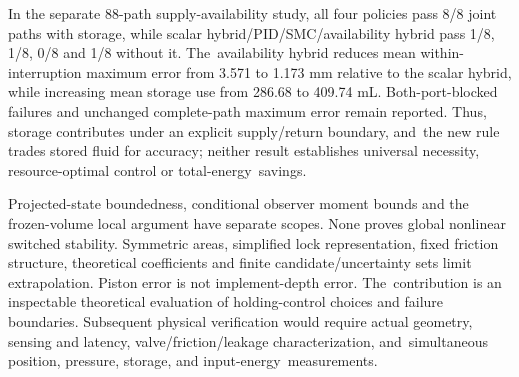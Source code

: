\documentclass[machines,article,submit,pdftex,moreauthors]{Definitions/mdpi}
\begin{document}
In the separate 88-path supply-availability study, all four policies pass 8/8 joint paths with storage, while scalar hybrid/PID/SMC/availability hybrid pass 1/8, 1/8, 0/8 and 1/8 without it. The~availability hybrid reduces mean within-interruption maximum error from 3.571 to 1.173 mm relative to the scalar hybrid, while increasing mean storage use from 286.68 to 409.74 mL. Both-port-blocked failures and unchanged complete-path maximum error remain reported. Thus, storage contributes under an explicit supply/return boundary, and~the new rule trades stored fluid for accuracy; neither result establishes universal necessity, resource-optimal control or total-energy~savings.

Projected-state boundedness, conditional observer moment bounds and the frozen-volume local argument have separate scopes. None proves global nonlinear switched stability. Symmetric areas, simplified lock representation, fixed friction structure, theoretical coefficients and finite candidate/uncertainty sets limit extrapolation. Piston error is not implement-depth error. The~contribution is an inspectable theoretical evaluation of holding-control choices and failure boundaries. Subsequent physical verification would require actual geometry, sensing and latency, valve/friction/leakage characterization, and~simultaneous position, pressure, storage, and input-energy~measurements.
\end{document}
